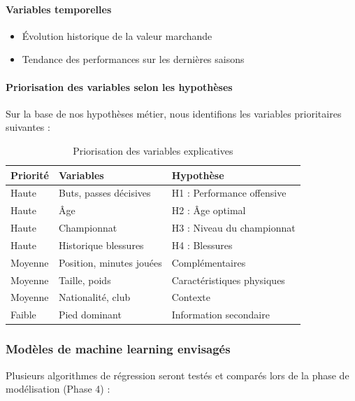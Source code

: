\documentclass[12pt,a4paper]{article}
\begin{document}
\paragraph{Variables temporelles}

\begin{itemize}[leftmargin=*]
    \item Évolution historique de la valeur marchande
    \item Tendance des performances sur les dernières saisons
\end{itemize}

\paragraph{Priorisation des variables selon les hypothèses}

Sur la base de nos hypothèses métier, nous identifions les variables prioritaires suivantes :

\begin{table}[h]
\centering
\begin{tabular}{@{}lll@{}}
\toprule
\textbf{Priorité} & \textbf{Variables} & \textbf{Hypothèse} \\ \midrule
Haute & Buts, passes décisives & H1 : Performance offensive \\
Haute & Âge & H2 : Âge optimal \\
Haute & Championnat & H3 : Niveau du championnat \\
Haute & Historique blessures & H4 : Blessures \\[0.2cm]
Moyenne & Position, minutes jouées & Complémentaires \\
Moyenne & Taille, poids & Caractéristiques physiques \\
Moyenne & Nationalité, club & Contexte \\[0.2cm]
Faible & Pied dominant & Information secondaire \\ \bottomrule
\end{tabular}
\caption{Priorisation des variables explicatives}
\end{table}

\subsubsection{Modèles de machine learning envisagés}

Plusieurs algorithmes de régression seront testés et comparés lors de la phase de modélisation (Phase 4) :
\end{document}
